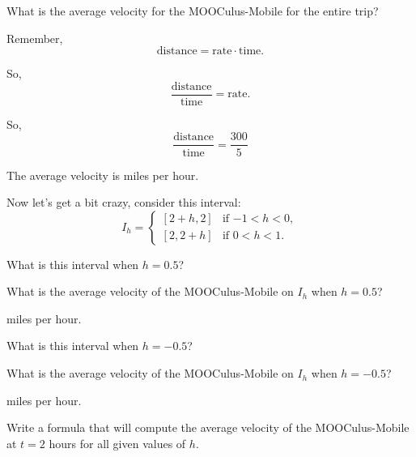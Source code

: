 \documentclass{ximera}
\begin{document}
\begin{problem}
  What is the average velocity for the MOOCulus-Mobile for the entire trip? 
\begin{hint}
Remember, 
\[
\text{distance} = \text{rate}\cdot\text{time}.
\]
\end{hint}
\begin{hint}
So, 
\[
\frac{\text{distance}}{\text{time}} = \text{rate}.
\]
\end{hint}
\begin{hint}
So, 
\[
\frac{\text{distance}}{\text{time}} = \frac{300}{5}
\]
\end{hint}
\begin{prompt}
The average velocity is  miles per hour.
\end{prompt}
\end{problem}

Now let's get a bit crazy, consider this interval:
\[
I_h = 
\begin{cases}
  [2+h,2]  & \text{if $-1<h<0$}, \\ %
  [2,2+h]  & \text{if $0<h<1$}.     %
\end{cases}
\]


\begin{problem}
  What is this interval when $h = 0.5$?
\end{problem}

\begin{problem}
  What is the average velocity of the MOOCulus-Mobile on $I_h$ when $h =
  0.5$?
  \begin{prompt}
     miles per hour.
  \end{prompt}
\end{problem}

\begin{problem}
  What is this interval when $h = -0.5$?
\end{problem}

\begin{problem}
  What is the average velocity of the MOOCulus-Mobile on $I_h$ when $h =
  -0.5$?
  \begin{prompt}
     miles per hour.
  \end{prompt}
\end{problem}

\begin{problem}
  Write a formula that will compute the average velocity of the
  MOOCulus-Mobile at $t=2$ hours for all given values of $h$.
\end{problem}
\end{document}

